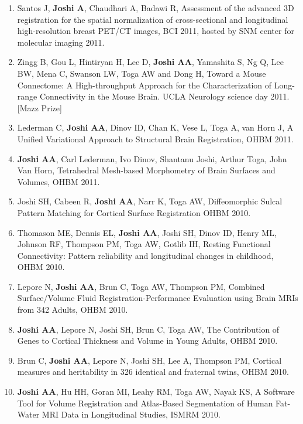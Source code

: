 \documentclass[overlapped,line,letterpaper]{res}
\begin{document}
\begin{resume}
\begin{enumerate}
    \item Santos J, \textbf{Joshi A}, Chaudhari A, Badawi R, {Assessment of the advanced 3D registration for the spatial normalization of cross-sectional and longitudinal high-resolution breast PET/CT images}, BCI 2011, hosted by SNM center for molecular imaging  2011.

    \item Zingg B, Gou L, Hintiryan H, Lee D, \textbf{Joshi AA}, Yamashita S, Ng Q, Lee BW, Mena C, Swanson LW, Toga AW and Dong H, {Toward a Mouse Connectome: A High-throughput Approach for the Characterization of Long-range Connectivity in the Mouse Brain}. UCLA Neurology science day 2011. [Mazz Prize]

    \item Lederman C, \textbf{Joshi AA}, Dinov ID, Chan K, Vese L, Toga A, van Horn J, {A Unified Variational Approach to Structural Brain Registration}, OHBM 2011.

    \item \textbf{Joshi AA}, Carl Lederman, Ivo Dinov, Shantanu Joshi, Arthur Toga, John Van Horn, {Tetrahedral Mesh-based Morphometry of Brain Surfaces and Volumes}, OHBM 2011.


    \item Joshi SH, Cabeen R, \textbf{Joshi AA}, Narr K, Toga AW, Diffeomorphic Sulcal Pattern Matching for Cortical Surface Registration OHBM 2010.

    \item Thomason ME, Dennis EL, \textbf{Joshi AA}, Joshi SH, Dinov ID, Henry ML, Johnson RF, Thompson PM, Toga AW, Gotlib IH, Resting Functional Connectivity: Pattern reliability and longitudinal changes in childhood, OHBM 2010.

    \item Lepore N, \textbf{Joshi AA}, Brun C, Toga AW, Thompson PM, Combined Surface/Volume Fluid Registration-Performance Evaluation using Brain MRIs from 342 Adults, OHBM 2010.

    \item \textbf{Joshi AA}, Lepore N, Joshi SH, Brun C, Toga AW, The Contribution of Genes to  Cortical Thickness and Volume in Young Adults, OHBM 2010.

    \item Brun C, \textbf{Joshi AA}, Lepore N, Joshi SH, Lee A, Thompson PM, Cortical measures and heritability in 326 identical and fraternal twins, OHBM 2010.

    \item \textbf{Joshi AA}, Hu HH, Goran MI, Leahy RM, Toga AW, Nayak KS, A Software Tool for Volume Registration and Atlas-Based Segmentation of Human Fat-Water MRI Data in Longitudinal Studies, ISMRM 2010.


\end{enumerate}
\end{resume}
\end{document}
